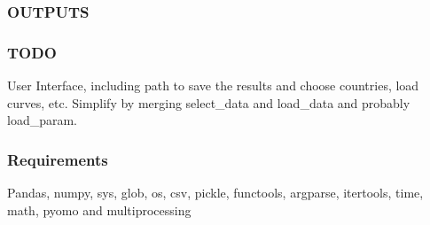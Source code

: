 \subsubsection*{O\+U\+T\+P\+U\+TS }

\subsubsection*{T\+O\+DO }

User Interface, including path to save the results and choose countries, load curves, etc. Simplify by merging select\+\_\+data and load\+\_\+data and probably load\+\_\+param. \subsubsection*{Requirements }

Pandas, numpy, sys, glob, os, csv, pickle, functools, argparse, itertools, time, math, pyomo and multiprocessing 